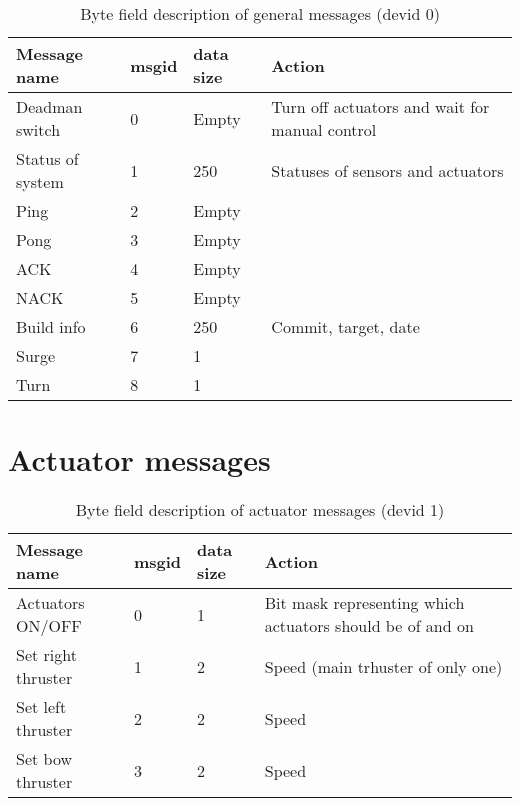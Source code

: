 \begin{table}[h]
	\centering
	\begin{tabular}{llll}
		\toprule
		\textbf{Message name}  & \textbf{msgid} & \textbf{data size} & \textbf{Action}\\
		\midrule
		Deadman switch & 0 & Empty & Turn off actuators and wait for manual control \\
		Status of system & 1 & 250 & Statuses of sensors and actuators \\
		Ping & 2 & Empty \\
		Pong & 3& Empty \\
		ACK & 4 & Empty\\
		NACK & 5 & Empty\\
		Build info & 6 & 250 & Commit, target, date\\
		Surge & 7 & 1 &\\
		Turn & 8 & 1 &\\
		\bottomrule
	\end{tabular}
	\caption{Byte field description of general messages (devid 0)}
	\label{tab:ack}
\end{table}


\section{Actuator messages}
\begin{table}[h]
	\centering
	\begin{tabular}{llll}
		\toprule
		\textbf{Message name}  & \textbf{msgid} & \textbf{data size} & \textbf{Action}\\
		\midrule
		Actuators ON/OFF & 0 & 1 & Bit mask representing which actuators should be of and on\\
		Set right thruster & 1 & 2 & Speed (main trhuster of only one) \\
		Set left thruster & 2 & 2 & Speed \\
		Set bow thruster & 3 & 2 & Speed \\
		\bottomrule
	\end{tabular}
	\caption{Byte field description of actuator messages (devid 1)}
	\label{tab:ack}
\end{table}

